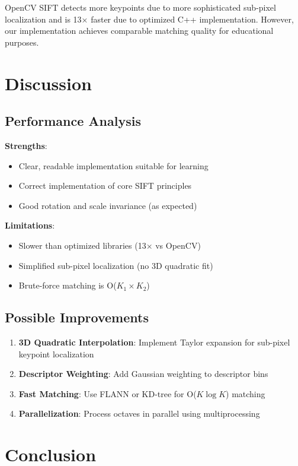 \documentclass[11pt, a4paper]{article}
\begin{document}
OpenCV SIFT detects more keypoints due to more sophisticated sub-pixel localization and is 13× faster due to optimized C++ implementation. However, our implementation achieves comparable matching quality for educational purposes.

\section{Discussion}

\subsection{Performance Analysis}

\textbf{Strengths}:
\begin{itemize}
    \item Clear, readable implementation suitable for learning
    \item Correct implementation of core SIFT principles
    \item Good rotation and scale invariance (as expected)
\end{itemize}

\textbf{Limitations}:
\begin{itemize}
    \item Slower than optimized libraries (13× vs OpenCV)
    \item Simplified sub-pixel localization (no 3D quadratic fit)
    \item Brute-force matching is O($K_1 \times K_2$)
\end{itemize}

\subsection{Possible Improvements}

\begin{enumerate}
    \item \textbf{3D Quadratic Interpolation}: Implement Taylor expansion for sub-pixel keypoint localization
    \item \textbf{Descriptor Weighting}: Add Gaussian weighting to descriptor bins
    \item \textbf{Fast Matching}: Use FLANN or KD-tree for O($K \log K$) matching
    \item \textbf{Parallelization}: Process octaves in parallel using multiprocessing
\end{enumerate}

\section{Conclusion}
\end{document}
